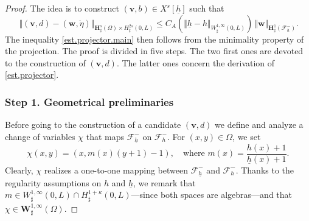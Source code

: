 \documentclass[JEP,XML,SOM,Unicode,NoFloatCountersInSection]{cedram}
\let\mathcal\mathscr
\theoremstyle{remark}
\theoremstyle{definition}
\newcommand{\norme}[1]{\,\Vert #1\Vert}
\newcommand{\vnorme}[1]{\Vert #1\Vert}
\newcommand{\vg}{\boldsymbol{v}}
\newcommand{\wg}{\boldsymbol{w}}
\newcommand{\BS}[1]{\boldsymbol{#1}}
\let\CM\Omega
\newcommand{\etap}{\dot{\eta}}
\newcommand{\hb}{{\underline{h}}}
\begin{document}
\begin{proof}
The idea is to construct $(\vg,b)\in X^{s}[\hb]$ such that
\begin{equation}\label{est.projector}
\norme{(\vg,d) -(\wg,\etap)}_{\BS{H}^{s}_{\sharp}(\CM)\times H^{2s}_{\sharp}(0,L)}\leq C_{A}(\vnorme{\hb -h }_{W^{1,\infty}_{\sharp}(0,L)})\norme{\wg}_{\BS{H}^{1}_{\sharp}(\mathcal{F}^{-}_{h})}.
\end{equation}
The inequality \eqref{est.projector.main} then follows from the minimality property of the projection.
The proof is divided in five steps. The two first ones are devoted to the construction of $(\vg,d)$. The latter ones
concern the derivation of \eqref{est.projector}.

\subsubsection*{Step 1. Geometrical preliminaries}
Before going to the construction of a candidate $(\vg,d)$ we define and analyze a change of variables
$\chi$ that maps $\mathcal{F}^-_{\hb}$ on $\mathcal{F}^-_{h}$. For $(x,y) \in \Omega$, we set
\[
\chi(x,y) = \left(x,m(x)(y+1)-1\right), \quad \text{where } m(x) = \frac{h(x)+1}{\hb(x)+1}.
\]
Clearly, $\chi$ realizes a one-to-one mapping between $\mathcal{F}^-_{\hb}$ and $\mathcal{F}^-_{h}$.
Thanks to the regularity assumptions on $h$ and $\hb$, we remark that $m\in W_\sharp^{1,\infty}(0, L)\cap H_\sharp^{1+\kappa}(0, L)$---since both spaces are algebras---and that $\chi \in \BS{W}_\sharp^{1, \infty}(\Omega)$.


\end{proof}
\end{document}
